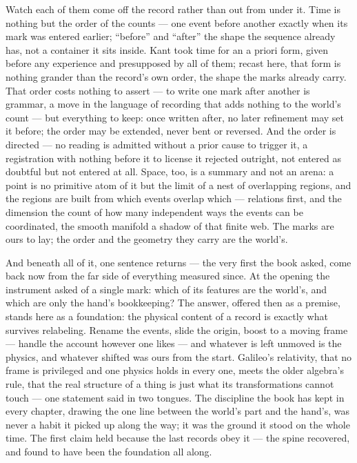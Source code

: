 Watch each of them come off the record rather than out from under it. Time is nothing but the order of the
counts --- one event before another exactly when its mark was entered earlier; ``before'' and ``after'' the
shape the sequence already has, not a container it sits inside. Kant took time for an a priori form, given
before any experience and presupposed by all of them; recast here, that form is nothing grander than the
record's own order, the shape the marks already carry. That order costs nothing to assert --- to write
one mark after another is grammar, a move in the language of recording that adds nothing to the world's count
--- but everything to keep: once written after, no later refinement may set it before; the order may be
extended, never bent or reversed. And the order is directed --- no reading is admitted without a prior cause to
trigger it, a registration with nothing before it to license it rejected outright, not entered as doubtful but
not entered at all. Space, too, is a summary and not an arena: a point is no primitive atom of it but the limit of a nest of
overlapping regions, and the regions are built from which events overlap which --- relations first, and the
dimension the count of how many independent ways the events can be coordinated, the smooth manifold a shadow of
that finite web. The marks are ours to lay; the
order and the geometry they carry are the world's.

And beneath all of it, one sentence returns --- the very first the book asked, come back now from the far side
of everything measured since. At the opening the instrument asked of a single mark: which of its features are
the world's, and which are only the hand's bookkeeping? The answer, offered then as a premise, stands here as a
foundation: the physical content of a record is exactly what survives relabeling. Rename the events, slide the
origin, boost to a moving frame --- handle the account however one likes --- and whatever is left unmoved is the
physics, and whatever shifted was ours from the start. Galileo's relativity, that no frame is privileged and
one physics holds in every one, meets the older algebra's rule, that the real structure of a thing is just what
its transformations cannot touch --- one statement said in two tongues. The discipline the book has kept in every chapter, drawing
the one line between the world's part and the hand's, was never a habit it picked up along the way; it was the
ground it stood on the whole time. The first claim held because the last records obey it --- the spine
recovered, and found to have been the foundation all along.

